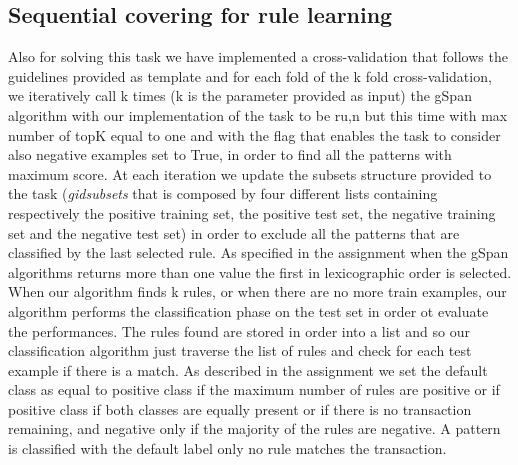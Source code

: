 \documentclass[10pt, a4paper]{article}
\begin{document}
		\subsection{Sequential covering for rule learning}
			Also for solving this task we have implemented a cross-validation that follows the guidelines provided as template and for each fold of the k fold cross-validation, we iteratively call k times (k is the parameter provided as input) the gSpan algorithm with our implementation of the task to be ru,n but this time with max number of topK equal to one and with the flag that enables the task to consider also negative examples set to True, in order to find all the patterns with maximum score. At each iteration we update the subsets structure provided to the task (\textit{\textit{gid\textunderscore subsets}} that is composed by four different lists containing respectively the positive training set, the positive test set, the negative training set and the negative test set) in order to exclude all the patterns that are classified by the last selected rule. As specified in the assignment when the gSpan algorithms returns more than one value the first in lexicographic order is selected.
			When our algorithm finds k rules, or when there are no more train examples, our algorithm performs the classification phase on the test set in order ot evaluate the performances. The rules found are stored in order into a list and so our classification algorithm just traverse the list of rules and check for each test example if there is a match. As described in the assignment we set the default class as equal to positive class if the maximum number of rules are positive or if positive class if both classes are equally present or if there is no transaction remaining, and negative only if the majority of the rules are negative. A pattern is classified with the default label only no rule matches the transaction.
\end{document}
